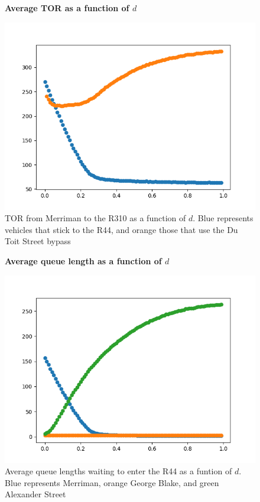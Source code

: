 \documentclass{article}
\begin{document}
\begin{figure}
\textbf{\large Average TOR as a function of $d$}\par\medskip
{}
\includegraphics[scale = 0.55, left]{./data/phase4/TORs_vs_d.png}
\vspace*{0.1cm}\hspace*{4.5cm}{\large $d$}
\caption{\label{fig} TOR from Merriman to the R310 as a function of $d$. Blue represents vehicles that stick to the R44, and orange those that use the Du Toit Street bypass}
\end{figure}

\begin{figure}
\textbf{\large Average queue length as a function of $d$}\par\medskip
{}
\includegraphics[scale = 0.55, left]{./data/phase4/queues_vs_d.png}
\vspace*{0.1cm}\hspace*{4.5cm}{\large $d$}
\caption{\label{fig} Average queue lengths waiting to enter the R44 as a funtion of $d$. Blue represents Merriman, orange George Blake, and green Alexander Street}
\end{figure}
\end{document}
